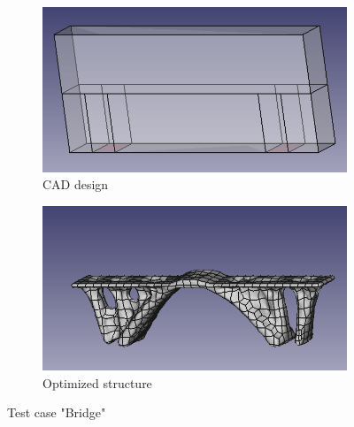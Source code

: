\begin{figure}[H]
\begin{center}
\begin{subfigure}[t]{.49\textwidth}
\begin{center}
\includegraphics[width=.9\textwidth]{Pictures/Results/BridgeIn.png}
\end{center}
\caption{CAD design}
\label{fig:bridgeCAD}
\end{subfigure}\hfill
\begin{subfigure}[t]{.49\textwidth}
\begin{center}
\includegraphics[width=.9\textwidth]{Pictures/Results/BridgeOut.png}
\end{center}
\caption{Optimized structure}
\label{fig:bridgeOPTIM}
\end{subfigure}
\caption{Test case "Bridge"}
\end{center}
\end{figure}
\newpage


